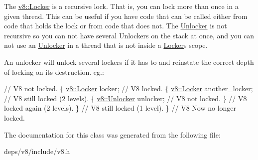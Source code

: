 The \hyperlink{classv8_1_1_locker}{v8\+::\+Locker} is a recursive lock. That is, you can lock more than once in a given thread. This can be useful if you have code that can be called either from code that holds the lock or from code that does not. The \hyperlink{classv8_1_1_unlocker}{Unlocker} is not recursive so you can not have several Unlockers on the stack at once, and you can not use an \hyperlink{classv8_1_1_unlocker}{Unlocker} in a thread that is not inside a \hyperlink{classv8_1_1_locker}{Locker}\textquotesingle{}s scope.

An unlocker will unlock several lockers if it has to and reinstate the correct depth of locking on its destruction. eg.\+:


\begin{DoxyCode}
\textcolor{comment}{// V8 not locked.}
\{
  \hyperlink{classv8_1_1_locker}{v8::Locker} locker;
  \textcolor{comment}{// V8 locked.}
  \{
    \hyperlink{classv8_1_1_locker}{v8::Locker} another\_locker;
    \textcolor{comment}{// V8 still locked (2 levels).}
    \{
      \hyperlink{classv8_1_1_unlocker}{v8::Unlocker} unlocker;
      \textcolor{comment}{// V8 not locked.}
    \}
    \textcolor{comment}{// V8 locked again (2 levels).}
  \}
  \textcolor{comment}{// V8 still locked (1 level).}
\}
\textcolor{comment}{// V8 Now no longer locked.}
\end{DoxyCode}
 

The documentation for this class was generated from the following file\+:\begin{DoxyCompactItemize}
\item 
deps/v8/include/v8.\+h\end{DoxyCompactItemize}
